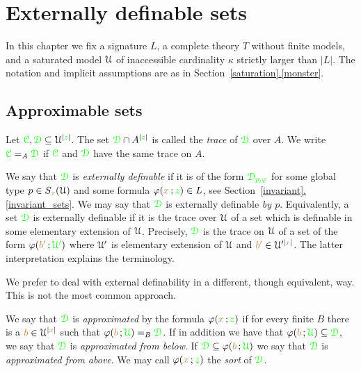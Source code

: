 \documentclass[creche.tex]{subfiles}
\begin{document}
\chapter{Externally definable sets}
\label{external}

\def\medrel#1{\parbox[t]{6ex}{$\displaystyle\hfil #1$}}
\def\ceq#1#2#3{\parbox{25ex}{$\displaystyle #1$}\medrel{#2}$\displaystyle  #3$}



In this chapter we fix a signature $L$, a complete theory $T$ without finite models, and a saturated model $\EuScript U$ of inaccessible cardinality $\kappa$ strictly larger than $|L|$.
The notation and implicit assumptions are as in Section~\hyperref[monster]{\ref*{saturation}.\ref*{monster}}.



\section{Approximable sets}
\label{approximable}

\def\ceq#1#2#3{\parbox{25ex}{$\displaystyle #1$}\medrel{#2}$\displaystyle  #3$}

Let ${\color{green}\EuScript C},{\color{green}\EuScript D}\subseteq\EuScript U^{|{\color{green} z}|}$.
The set ${\color{green}\EuScript D}\cap A^{|{\color{green} z}|}$ is called the \emph{trace\/} of ${\color{green}\EuScript D}$ over $A$.
We write ${\color{green}\EuScript C}=_A{\color{green}\EuScript D}$ if  ${\color{green}\EuScript C}$ and ${\color{green}\EuScript D}$ have the same trace on $A$.

We say that ${\color{green}\EuScript D}$ is \emph{externally definable\/} if it is of the form ${\color{green}\EuScript D_{p,\varphi}}$ for some global type $p\in S_{\color{brown} x}(\EuScript U)$ and some formula $\varphi({\color{brown} x}\,;{\color{green} z})\in L$, see Section~\hyperref[invariant_sets]{\ref*{invariant}.\ref*{invariant_sets}}. We may say that ${\color{green}\EuScript D}$ is externally definable \emph{by $p$}. Equivalently, a set ${\color{green}\EuScript D}$ is externally definable if it is the trace over $\EuScript U$ of a set which is definable in some elementary extension of $\EuScript U$. Precisely, ${\color{green}\EuScript D}$ is the trace on $\EuScript U$ of a set of the form $\varphi({\color{brown} b'}\,;{\color{green}\EuScript U'})$ where $\EuScript U'$ is elementary extension of $\EuScript U$ and ${\color{brown} b'}\in\EuScript U'^{|{\color{brown} x}|}$. The latter interpretation explains the terminology.

\noindent\llap{\textcolor{red}{\Large\danger}\kern1.5ex}We prefer to deal with external definability in a different, though equivalent, way.
This is not the most common approach.

\begin{definition}\label{def_epprox}
We say that ${\color{green}\EuScript D}$ is \emph{approximated\/} by the formula $\varphi({\color{brown} x}\,;{\color{green} z})$ if for every finite $B$ there is a ${\color{brown} b}\in\EuScript U^{|{\color{brown} x}|}$ such that $\varphi({\color{brown} b}\,;{\color{green}\EuScript U})=_B{\color{green}\EuScript D}$.
If in addition we have that $\varphi({\color{brown} b}\,;{\color{green}\EuScript U})\subseteq{\color{green}\EuScript D}$, we say that  ${\color{green}\EuScript D}$ is \emph{approximated from below}.
If  ${\color{green}\EuScript D}\subseteq\varphi({\color{brown} b}\,;{\color{green}\EuScript U})$ we say that  ${\color{green}\EuScript D}$ is \emph{approximated from above}.
We may call $\varphi({\color{brown} x}\,;{\color{green} z})$ the \emph{sort} of ${\color{green}\EuScript D}$.\QED
\end{definition} 
 
\end{document}
